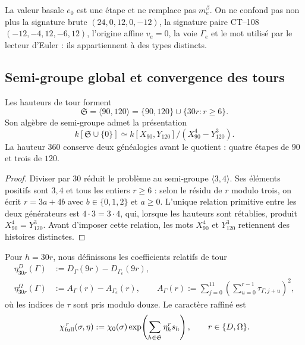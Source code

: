 La valeur basale \(e_0\) est une étape et ne remplace pas \(m_e^\beta\). On ne confond pas non plus la signature brute \((24,0,12,0,-12)\), la signature paire CT--108 \((-12,-4,12,-6,12)\), l'origine affine \(v_e=0\), la voie \(\Gamma_e\) et le mot utilisé par le lecteur d'Euler : ils appartiennent à des types distincts.

\subsection{Semi-groupe global et convergence des tours}

\begin{theorem}
\label{10j-thm-semigrupo}
Les hauteurs de tour forment
\begin{equation}
 \mathfrak S=\langle90,120\rangle
 =\{90,120\}\cup\{30r:r\ge6\}.
 \label{10j-eq-semigrupo}
\end{equation}
Son algèbre de semi-groupe admet la présentation
\begin{equation}
 k[\mathfrak S\cup\{0\}]
 \simeq k[X_{90},Y_{120}]/(X_{90}^4-Y_{120}^3).
 \label{10j-eq-algebra-semigrupo}
\end{equation}
La hauteur \(360\) conserve deux généalogies avant le quotient : quatre étapes de \(90\) et trois de \(120\).
\end{theorem}

\begin{proof}
Diviser par \(30\) réduit le problème au semi-groupe \(\langle3,4\rangle\). Ses éléments positifs sont \(3,4\) et tous les entiers \(r\ge6\) : selon le résidu de \(r\) modulo trois, on écrit \(r=3a+4b\) avec \(b\in\{0,1,2\}\) et \(a\ge0\). L'unique relation primitive entre les deux générateurs est \(4\cdot3=3\cdot4\), qui, lorsque les hauteurs sont rétablies, produit \(X_{90}^4=Y_{120}^3\). Avant d'imposer cette relation, les mots \(X_{90}^4\) et \(Y_{120}^3\) retiennent des histoires distinctes.
\end{proof}

Pour \(h=30r\), nous définissons les coefficients relatifs de tour
\begin{align}
 \eta_{30r}^D(\Gamma)
 &:=D_\Gamma(9r)-D_{\Gamma_e}(9r),
 \label{10j-eq-eta-d}\\
 \eta_{30r}^\Omega(\Gamma)
 &:=A_\Gamma(r)-A_{\Gamma_e}(r),
 \qquad
 A_\Gamma(r):=
 \sum_{j=0}^{11}
 \left(\sum_{u=0}^{r-1}\tau_{\Gamma,j+u}\right)^2,
 \label{10j-eq-eta-omega}
\end{align}
où les indices de \(\tau\) sont pris modulo douze. Le caractère raffiné est
\begin{equation}
 \chi_{\rm full}^{\,r}(\sigma,\eta)
 :=\chi_0(\sigma)
 \exp\!\left(\sum_{h\in\mathfrak S}\eta_h^r s_h\right),
 \qquad r\in\{D,\Omega\}.
 \label{10j-eq-caracter-full}
\end{equation}

